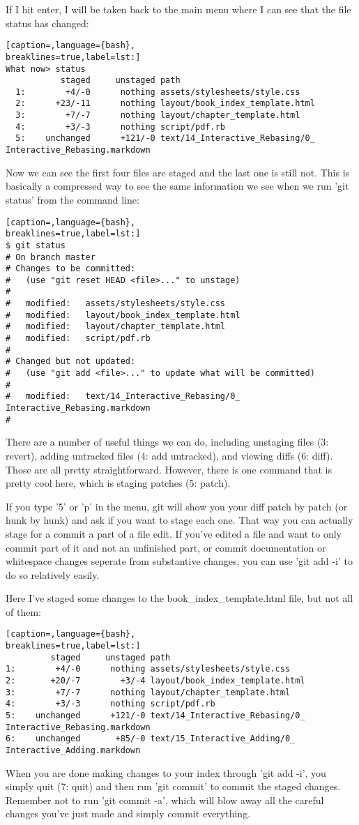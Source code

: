 If I hit enter, I will be taken back to the main menu where I can see that the file status has changed:
\lstset{basicstyle=\scriptsize, numbers=none, captionpos=b, tabsize=4}
\begin{lstlisting}[caption=,language={bash},
breaklines=true,label=lst:]
What now> status
           staged     unstaged path
  1:        +4/-0      nothing assets/stylesheets/style.css
  2:      +23/-11      nothing layout/book_index_template.html
  3:        +7/-7      nothing layout/chapter_template.html
  4:        +3/-3      nothing script/pdf.rb
  5:    unchanged      +121/-0 text/14_Interactive_Rebasing/0_ Interactive_Rebasing.markdown
\end{lstlisting}

Now we can see the first four files are staged and the last one is still not.
This is basically a compressed way to see the same information we see when we
run 'git status' from the command line:
\lstset{basicstyle=\scriptsize, numbers=none, captionpos=b, tabsize=4}
\begin{lstlisting}[caption=,language={bash},
breaklines=true,label=lst:]
$ git status
# On branch master
# Changes to be committed:
#   (use "git reset HEAD <file>..." to unstage)
#
#   modified:   assets/stylesheets/style.css
#   modified:   layout/book_index_template.html
#   modified:   layout/chapter_template.html
#   modified:   script/pdf.rb
#
# Changed but not updated:
#   (use "git add <file>..." to update what will be committed)
#
#   modified:   text/14_Interactive_Rebasing/0_ Interactive_Rebasing.markdown
#
\end{lstlisting}

There are a number of useful things we can do, including unstaging files (3:
revert), adding untracked files (4: add untracked), and viewing diffs (6:
diff). Those are all pretty straightforward. However, there is one command that
is pretty cool here, which is staging patches (5: patch).

If you type '5' or 'p' in the menu, git will show you your diff patch by patch
(or hunk by hunk) and ask if you want to stage each one. That way you can
actually stage for a commit a part of a file edit. If you've edited a file and
want to only commit part of it and not an unfinished part, or commit
documentation or whitespace changes seperate from substantive changes, you can
use 'git add -i' to do so relatively easily.

Here I've staged some changes to the book\_index\_template.html file, but not all
of them:
\lstset{basicstyle=\scriptsize, numbers=none, captionpos=b, tabsize=4}
\begin{lstlisting}[caption=,language={bash},
breaklines=true,label=lst:]
         staged     unstaged path
1:        +4/-0      nothing assets/stylesheets/style.css
2:       +20/-7        +3/-4 layout/book_index_template.html
3:        +7/-7      nothing layout/chapter_template.html
4:        +3/-3      nothing script/pdf.rb
5:    unchanged      +121/-0 text/14_Interactive_Rebasing/0_ Interactive_Rebasing.markdown
6:    unchanged       +85/-0 text/15_Interactive_Adding/0_ Interactive_Adding.markdown
\end{lstlisting}

When you are done making changes to your index through 'git add -i', you simply
quit (7: quit) and then run 'git commit' to commit the staged changes. Remember
not to run 'git commit -a', which will blow away all the careful changes you've
just made and simply commit everything.
